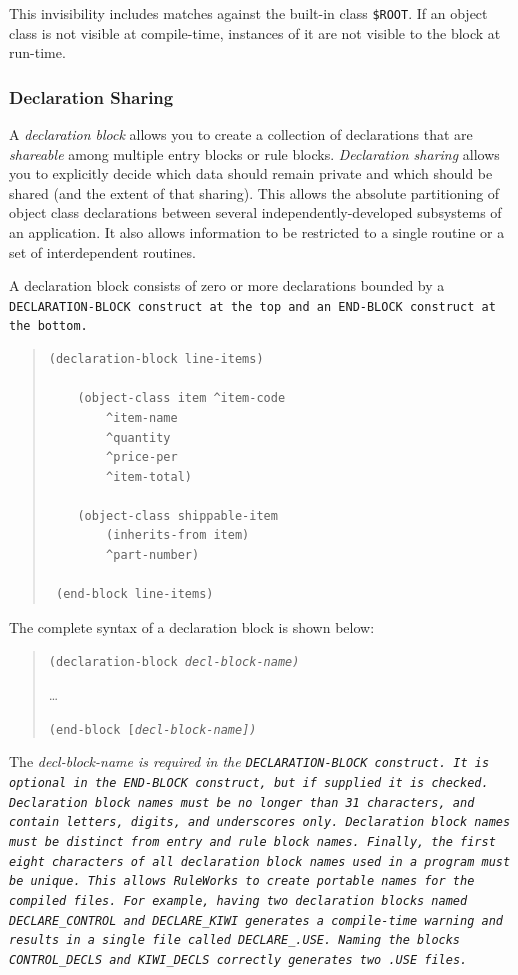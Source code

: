 This invisibility includes matches against the built-in class
\verb|$ROOT|. If an object class is not visible at compile-time,
instances of it are not visible to the block at run-time.

\subsubsection{Declaration Sharing}

A \emph{declaration block} allows you to create a collection of
declarations that are \emph{shareable} among multiple entry blocks or
rule blocks.  \emph{Declaration sharing} allows you to explicitly
decide which data should remain private and which should be shared
(and the extent of that sharing). This allows the absolute
partitioning of object class declarations between several
independently-developed subsystems of an application. It also allows
information to be restricted to a single routine or a set of
interdependent routines.

A declaration block consists of zero or more declarations bounded by a
\tt{DECLARATION-BLOCK} construct at the top and an \tt{END-BLOCK}
construct at the bottom.

\begin{quote}
\begin{verbatim}
(declaration-block line-items)

    (object-class item ^item-code
        ^item-name
        ^quantity
        ^price-per
        ^item-total)

    (object-class shippable-item
        (inherits-from item)
        ^part-number)

 (end-block line-items)
\end{verbatim}
\end{quote}

The complete syntax of a declaration block is shown below:
\begin{quote}
\verb|(|\tt{declaration-block} \it{decl-block-name}\verb|)|\par
{} \ldots\par
\verb|(|\tt{end-block} [\it{decl-block-name}]\verb|)|
\end{quote}
 
The \it{decl-block-name} is required in the \tt{DECLARATION-BLOCK}
construct. It is optional in the \tt{END-BLOCK} construct, but if
supplied it is checked. Declaration block names must be no longer than
31 characters, and contain letters, digits, and underscores only.
Declaration block names must be distinct from entry and rule block
names. Finally, the first eight characters of all declaration block
names used in a program must be unique. This allows RuleWorks to
create portable names for the compiled files. For example, having two
declaration blocks named \verb|DECLARE_CONTROL| and
\verb|DECLARE_KIWI| generates a compile-time warning and results in a
single file called \verb|DECLARE_.USE|. Naming the blocks
\verb|CONTROL_DECLS| and \verb|KIWI_DECLS| correctly generates two
\verb|.USE| files.

